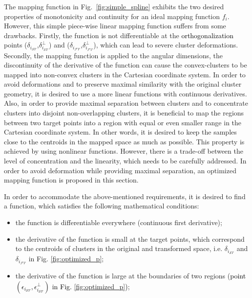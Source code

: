 The mapping function in Fig.~\ref{fig:simple_spline} exhibits the two desired properties of monotonicity and continuity for an ideal mapping function $f_i$. However, this simple piece-wise linear mapping function suffers from some drawbacks. Firstly, the function is not differentiable at the \textcolor{black}{orthogonalization} points ($\delta_{i_{{\mathcal{SV}}}}$,$\delta^{\perp}_{i_{{\mathcal{SV}}}}$) and ($\delta_{i_{{\mathcal{FV}}}}$,$\delta^{\perp}_{i_{{\mathcal{FV}}}}$), which can lead to severe cluster deformations. Secondly, the mapping function is applied to the angular dimensions, the discontinuity of the derivative of  %
the function can cause the convex-clusters to be mapped into non-convex clusters in the Cartesian coordinate system. In order to avoid deformations and to preserve maximal similarity with the original cluster geometry, it is desired to use a more linear functions with continuous derivatives. Also, in order to provide maximal separation between clusters and to concentrate clusters into disjoint non-overlapping clusters, it is beneficial to map the regions between two target points into a region with equal or even smaller range in the Cartesian coordinate system. In other words, it is desired to keep the samples close to the centroids in the mapped space as much as possible. This property is achieved by using nonlinear functions. However, there is a trade-off between the level of concentration and the linearity, which needs to be carefully addressed. In order to avoid deformation while providing maximal separation, an optimized mapping function is proposed in this section.

In order to accommodate the above-mentioned requirements, it is desired to find a function, which satisfies the following mathematical conditions:

\begin{itemize}
\item the function is differentiable everywhere (continuous first derivative);
\item the derivative of the function is small at the target points, which correspond to the centroids of clusters in the original and transformed space, i.e. $\delta_{i_{{\mathcal{SV}}}}$ and $\delta_{i_{{\mathcal{FV}}}}$ in Fig. \ref{fig:optimized_p};
\item the derivative of the function is large at the boundaries of two regions (\textcolor{black}{point $(\epsilon_{i_{{\mathcal{SV}}}},\epsilon^{\perp}_{i_{{\mathcal{SV}}}})$ in Fig. \ref{fig:optimized_p})};
\end{itemize}


